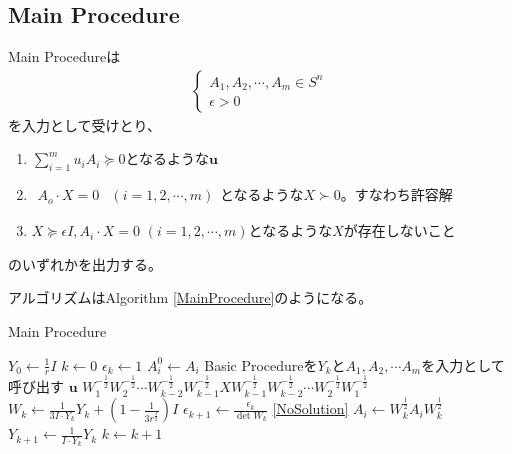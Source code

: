 \subsection{Main Procedure}
Main Procedureは
\begin{align*}
  \left\{
    \begin{array}{l}
      A_1, A_2, \cdots, A_m \in S^n \\
      \epsilon > 0
    \end{array}
  \right.
\end{align*}
を入力として受けとり、
\begin{enumerate}[label=(\alph*)]
  \item $\displaystyle{\sum_{i = 1}^m u_i A_i \succeq 0}$となるような$\mathbf{u}$ \label{DualSolution}
  \item $\begin{array}{ll} A_o \cdot X = 0 & (i = 1, 2, \cdots, m) \end{array}$となるような$X \succ 0$。すなわち許容解 \label{FeasibleSolution}
  \item $X \succeq \epsilon I, A_i \cdot X = 0 \,\, (i = 1, 2, \cdots, m)$となるような$X$が存在しないこと \label{NoSolution}
\end{enumerate}
のいずれかを出力する。

アルゴリズムはAlgorithm \ref{MainProcedure}のようになる。
\begin{algorithm}
  \caption{Main Procedure}
  \label{MainProcedure}
  \begin{algorithmic}[1]
    \State $\displaystyle{Y_0 \leftarrow \frac{1}{r} I}$
    \State $k \leftarrow 0$
    \State $\epsilon_k \leftarrow 1$
      \State $A_i^0 \leftarrow A_i$
    \EndFor
    \State Basic Procedureを$Y_k$と$A_1, A_2, \cdots A_m$を入力として呼び出す \label{CallBasicProcedure}
      \State \Return $\mathbf{u}$
      \State \Return $\displaystyle{W_1^{-\frac{1}{2}} W_2^{-\frac{1}{2}} \cdots W_{k - 2}^{-\frac{1}{2}} W_{k - 1}^{-\frac{1}{2}} X W_{k - 1}^{-\frac{1}{2}} W_{k - 2}^{-\frac{1}{2}} \cdots W_2^{-\frac{1}{2}} W_1^{-\frac{1}{2}}}$
    \EndIf
    \State $\displaystyle{W_k \leftarrow \frac{1}{3 I \cdot Y_k} Y_k + (1 - \frac{1}{3 r^\frac{3}{2}}) I}$
    \State $\displaystyle{\epsilon_{k + 1} \leftarrow \frac{\epsilon_k}{\det W_k}}$
      \State \Return \ref{NoSolution}
    \EndIf
      \State $\displaystyle{A_i \leftarrow W_k^\frac{1}{2} A_i W_k^\frac{1}{2}}$
    \EndFor
    \State $\displaystyle{Y_{k + 1} \leftarrow \frac{1}{I \cdot Y_k} Y_k}$
    \State $k \leftarrow k + 1$
    \State {}
  \end{algorithmic}
\end{algorithm}

